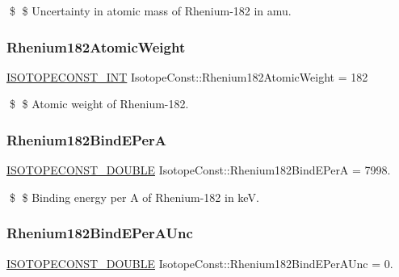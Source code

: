 \$ \$ Uncertainty in atomic mass of Rhenium-\/182 in amu. \mbox{\label{group___isotope_const-_rhenium-_re182_ga0fde7c5ae18ecb6c6ba02fce2b8a94dd}} 
\subsubsection{\texorpdfstring{Rhenium182\+Atomic\+Weight}{Rhenium182AtomicWeight}}
{\footnotesize\ttfamily \mbox{\hyperlink{group___isotope_const-_macros_ga5f18360b3e99483a35c32d789e62621c}{I\+S\+O\+T\+O\+P\+E\+C\+O\+N\+S\+T\+\_\+\+I\+NT}} Isotope\+Const\+::\+Rhenium182\+Atomic\+Weight = 182}

\$ \$ Atomic weight of Rhenium-\/182. \mbox{\label{group___isotope_const-_rhenium-_re182_ga90166d95cee64096b2823adae10998ca}} 
\subsubsection{\texorpdfstring{Rhenium182\+Bind\+E\+PerA}{Rhenium182BindEPerA}}
{\footnotesize\ttfamily \mbox{\hyperlink{group___isotope_const-_macros_ga8f45a7272ce02c0b4c65c44636ed719a}{I\+S\+O\+T\+O\+P\+E\+C\+O\+N\+S\+T\+\_\+\+D\+O\+U\+B\+LE}} Isotope\+Const\+::\+Rhenium182\+Bind\+E\+PerA = 7998.}

\$ \$ Binding energy per A of Rhenium-\/182 in keV. \mbox{\label{group___isotope_const-_rhenium-_re182_gaf7c4449c098acb2f5f53d23ae003c690}} 
\subsubsection{\texorpdfstring{Rhenium182\+Bind\+E\+Per\+A\+Unc}{Rhenium182BindEPerAUnc}}
{\footnotesize\ttfamily \mbox{\hyperlink{group___isotope_const-_macros_ga8f45a7272ce02c0b4c65c44636ed719a}{I\+S\+O\+T\+O\+P\+E\+C\+O\+N\+S\+T\+\_\+\+D\+O\+U\+B\+LE}} Isotope\+Const\+::\+Rhenium182\+Bind\+E\+Per\+A\+Unc = 0.}

